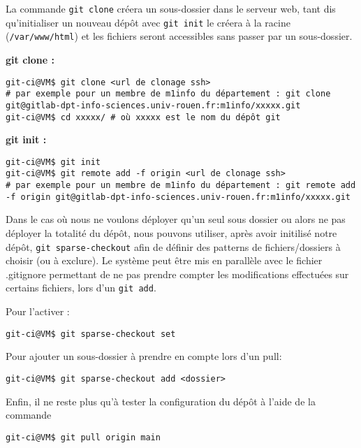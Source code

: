 La commande \texttt{git clone} créera un sous-dossier dans le serveur web, tant dis qu'initialiser un nouveau dépôt avec \texttt{git init} le créera à la racine (\texttt{/var/www/html}) et les fichiers seront accessibles sans passer par un sous-dossier.

\textbf{git clone :}

    \begin{verbatim}
git-ci@VM$ git clone <url de clonage ssh>
# par exemple pour un membre de m1info du département : git clone git@gitlab-dpt-info-sciences.univ-rouen.fr:m1info/xxxxx.git
git-ci@VM$ cd xxxxx/ # où xxxxx est le nom du dépôt git
    \end{verbatim}


\bigskip
\textbf{git init :}

    \begin{verbatim}
git-ci@VM$ git init
git-ci@VM$ git remote add -f origin <url de clonage ssh>
# par exemple pour un membre de m1info du département : git remote add -f origin git@gitlab-dpt-info-sciences.univ-rouen.fr:m1info/xxxxx.git
    \end{verbatim}



Dans le cas où nous ne voulons déployer qu'un seul sous dossier ou alors ne pas déployer la totalité du dépôt, nous pouvons utiliser, après avoir initilisé notre dépôt, \texttt{git sparse-checkout} afin de définir des patterns de fichiers/dossiers à choisir (ou à exclure). Le système peut être mis en parallèle avec le fichier .gitignore permettant de ne pas prendre compter les modifications effectuées sur certains fichiers, lors d'un \texttt{git add}.


Pour l'activer :

    \begin{verbatim}
git-ci@VM$ git sparse-checkout set
    \end{verbatim}


Pour ajouter un sous-dossier à prendre en compte lors d'un pull:

    \begin{verbatim}
git-ci@VM$ git sparse-checkout add <dossier>
    \end{verbatim}



Enfin, il ne reste plus qu'à tester la configuration du dépôt à l'aide de la commande

    \begin{verbatim}
git-ci@VM$ git pull origin main
    \end{verbatim}



